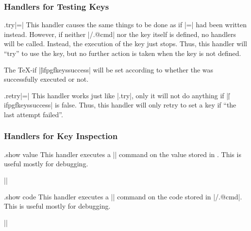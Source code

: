 \subsubsection{Handlers for Testing Keys}

\begin{handler}{{.try}|=|}
  This handler causes the same things to be done as if
  |=| had been written instead. However, if
  neither |/.@cmd| nor the key itself is defined, no
  handlers will be called. Instead, 
  the execution of the key just stops. Thus, this handler will ``try''
  to use the key, but no further action is taken when the key is not
  defined.

  The \TeX-if |\||ifpgfkeyssuccess| will be set according to whether
  the  was successfully executed or not. 
\begin{codeexample}[]
\end{codeexample}
\end{handler}

\begin{handler}{{.retry}|=|}
  This handler works just like |.try|, only it will not do anything if
  |\||ifpgfkeyssuccess| is false. Thus, this handler will only retry
  to set a key if ``the last attempt failed''. 
\begin{codeexample}[]
\end{codeexample}
\end{handler}


\subsubsection{Handlers for Key Inspection}

\begin{handler}{{.show value}}
  This handler executes a |\show| command on the value stored in
  . This is useful mostly for debugging.

  \example ||
\end{handler}

\begin{handler}{{.show code}}
  This handler executes a |\show| command on the code stored in
  |/.@cmd|. This is useful mostly for debugging.

  \example ||
\end{handler}


